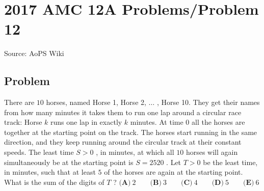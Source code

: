 \documentclass[12pt]{article}
\begin{document}
\section*{{2017 AMC 12A Problems/Problem 12}}
Source: AoPS Wiki

\subsection*{Problem}
There are $10$ horses, named Horse 1, Horse 2, $\ldots$ , Horse 10. They get their names from how many minutes it takes them to run one lap around a circular race track: Horse $k$ runs one lap in exactly $k$ minutes. At time 0 all the horses are together at the starting point on the track. The horses start running in the same direction, and they keep running around the circular track at their constant speeds. The least time $S > 0$ , in minutes, at which all $10$ horses will again simultaneously be at the starting point is $S = 2520$ . Let $T>0$ be the least time, in minutes, such that at least $5$ of the horses are again at the starting point. What is the sum of the digits of $T$ ? $\textbf{(A)}\ 2\qquad\textbf{(B)}\ 3\qquad\textbf{(C)}\ 4\qquad\textbf{(D)}\ 5\qquad\textbf{(E)}\ 6$
\end{document}
